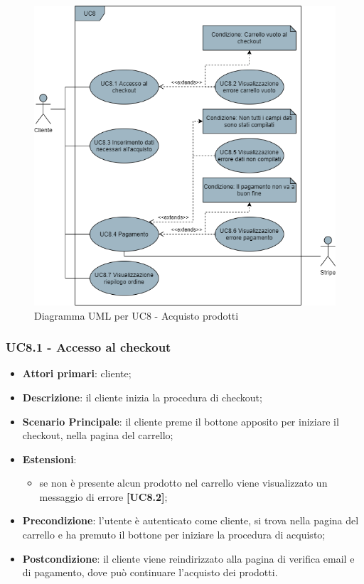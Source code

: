 \begin{figure}[H]
\centering
\includegraphics[scale=0.6]{res/UseCase/Immagini/AcquistoProdotti}
\caption{Diagramma UML per UC8 - Acquisto prodotti}
\end{figure}

\subsubsection{UC8.1 - Accesso al checkout}
\begin{itemize}
\item \textbf{Attori primari}: cliente;
\item \textbf{Descrizione}: il cliente inizia la procedura di checkout;
\item \textbf{Scenario Principale}: il cliente preme il bottone apposito per iniziare il checkout, nella pagina del carrello;
\item \textbf{Estensioni}:
\begin{itemize}
\item se non è presente alcun prodotto nel carrello viene visualizzato un messaggio di errore \textbf{[UC8.2]};
\end{itemize}
\item \textbf{Precondizione}: l'utente è autenticato come cliente, si trova nella pagina del carrello e ha premuto il bottone per iniziare la procedura di acquisto;
\item \textbf{Postcondizione}: il cliente viene reindirizzato alla pagina di verifica email e di pagamento, dove può continuare l'acquisto dei prodotti.
\end{itemize}

